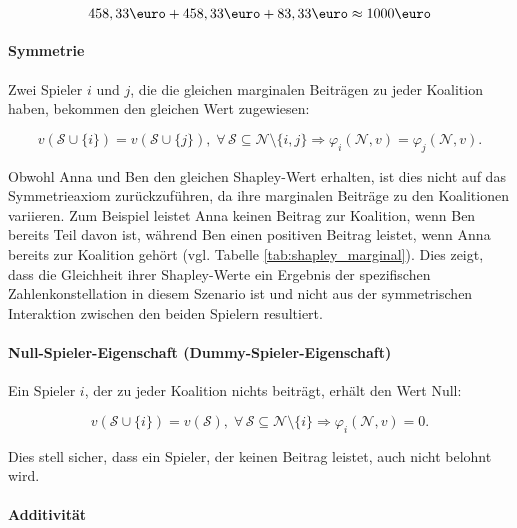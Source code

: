 \begin{equation}
  458,33 \text{\euro} + 458,33 \text{\euro} + 83,33 \text{\euro} \approx 1000 \text{\euro} 
\end{equation}


\paragraph{\rmfamily\bfseries Symmetrie}

Zwei Spieler $i$ und $j$, die die gleichen marginalen Beiträgen zu jeder Koalition haben, bekommen den gleichen Wert
zugewiesen:

\begin{equation}
v(\mathcal{S} \cup \{i\}) = v(\mathcal{S} \cup \{j\}), \; \forall\, \mathcal{S} \subseteq \mathcal{N} \setminus \{i, j\} \Rightarrow \varphi_i (\mathcal{N}, v) = \varphi_j (\mathcal{N}, v).
\end{equation}

Obwohl Anna und Ben den gleichen Shapley-Wert erhalten, ist dies nicht auf das Symmetrieaxiom zurückzuführen, 
da ihre marginalen Beiträge zu den Koalitionen variieren. Zum Beispiel leistet Anna keinen Beitrag zur Koalition, 
wenn Ben bereits Teil davon ist, während Ben einen positiven Beitrag leistet, 
wenn Anna bereits zur Koalition gehört (vgl. Tabelle \ref{tab:shapley_marginal}). Dies zeigt, dass die Gleichheit ihrer Shapley-Werte ein Ergebnis der 
spezifischen Zahlenkonstellation in diesem Szenario ist und nicht aus der symmetrischen Interaktion 
zwischen den beiden Spielern resultiert.

\paragraph{\rmfamily\bfseries Null-Spieler-Eigenschaft (Dummy-Spieler-Eigenschaft)}

Ein Spieler $i$, der zu jeder Koalition nichts beiträgt, erhält den Wert Null:

\begin{equation}
  v(\mathcal{S} \cup \{i\}) =  v(\mathcal{S}), \; \forall\, \mathcal{S} \subseteq \mathcal{N} \setminus \{i\} \Rightarrow \varphi_i (\mathcal{N}, v) = 0.
\end{equation}

Dies stell sicher, dass ein Spieler, der keinen Beitrag leistet, auch nicht belohnt wird. 

\paragraph{\rmfamily\bfseries Additivität} 

